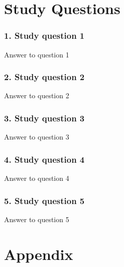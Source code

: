 \documentclass{article}
\begin{document}
\section*{\textcolor{mycolor}{Study Questions}}
\subsubsection*{\textcolor{mycolor}{1. Study question 1}}
Answer to question 1
\subsubsection*{\textcolor{mycolor}{2. Study question 2}}
Answer to question 2
\subsubsection*{\textcolor{mycolor}{3. Study question 3}}
Answer to question 3
\subsubsection*{\textcolor{mycolor}{4. Study question 4}}
Answer to question 4
\subsubsection*{\textcolor{mycolor}{5. Study question 5}}
Answer to question 5
\section*{\textcolor{mycolor}{Appendix}}
\end{document}
